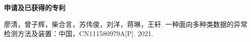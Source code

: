 \begin{publication}

\noindent\textbf{申请及已获得的专利}
\begin{publist}
\item 廖清，曾子辉，柴合言，苏伟俊，刘洋，蒋琳，王轩. 一种面向多种类数据的异常检测方法及装置：中国，CN111580979A[P]. 2021.
\end{publist}


\end{publication}
